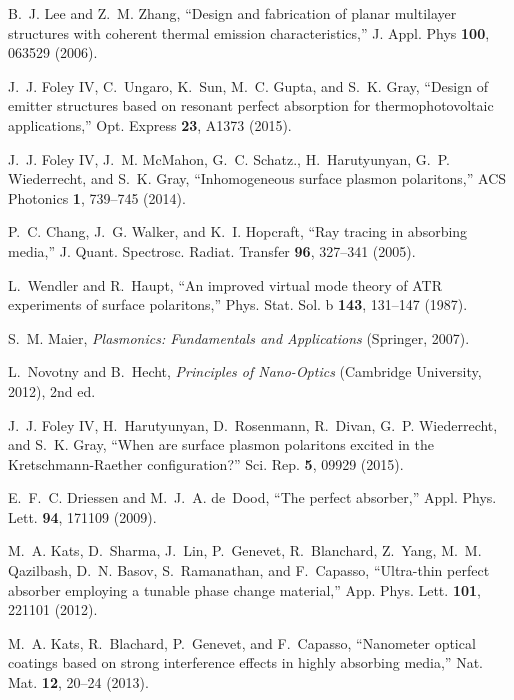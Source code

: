 \documentclass[10pt,letterpaper]{article}
\begin{document}
\begin{thebibliography}{100}
B.~J. Lee and Z.~M. Zhang, \enquote{Design and fabrication of planar multilayer
  structures with coherent thermal emission characteristics,} J. Appl. Phys
  \textbf{100}, 063529 (2006).

J.~J. {Foley IV}, C.~Ungaro, K.~Sun, M.~C. Gupta, and S.~K. Gray,
  \enquote{Design of emitter structures based on resonant perfect absorption
  for thermophotovoltaic applications,} Opt. Express \textbf{23}, A1373 (2015).

J.~J. {Foley IV}, J.~M. McMahon, G.~C. Schatz., H.~Harutyunyan, G.~P.
  Wiederrecht, and S.~K. Gray, \enquote{Inhomogeneous surface plasmon
  polaritons,} ACS Photonics \textbf{1}, 739--745 (2014).

P.~C. Chang, J.~G. Walker, and K.~I. Hopcraft, \enquote{Ray tracing in
  absorbing media,} J. Quant. Spectrosc. Radiat. Transfer \textbf{96}, 327--341
  (2005).

L.~Wendler and R.~Haupt, \enquote{An improved virtual mode theory of {ATR}
  experiments of surface polaritons,} Phys. Stat. Sol. b \textbf{143}, 131--147
  (1987).

S.~M. Maier, \emph{Plasmonics: Fundamentals and Applications} (Springer, 2007).

L.~Novotny and B.~Hecht, \emph{Principles of Nano-Optics} (Cambridge
  University, 2012), 2nd ed.

J.~J. {Foley IV}, H.~Harutyunyan, D.~Rosenmann, R.~Divan, G.~P. Wiederrecht,
  and S.~K. Gray, \enquote{When are surface plasmon polaritons excited in the
  {K}retschmann-{R}aether configuration?} Sci. Rep. \textbf{5}, 09929 (2015).

E.~F.~C. Driessen and M.~J.~A. de~Dood, \enquote{The perfect absorber,} Appl.
  Phys. Lett. \textbf{94}, 171109 (2009).

M.~A. Kats, D.~Sharma, J.~Lin, P.~Genevet, R.~Blanchard, Z.~Yang, M.~M.
  Qazilbash, D.~N. Basov, S.~Ramanathan, and F.~Capasso, \enquote{Ultra-thin
  perfect absorber employing a tunable phase change material,} App. Phys. Lett.
  \textbf{101}, 221101 (2012).

M.~A. Kats, R.~Blachard, P.~Genevet, and F.~Capasso, \enquote{Nanometer optical
  coatings based on strong interference effects in highly absorbing media,}
  Nat. Mat. \textbf{12}, 20--24 (2013).


\end{thebibliography}
\end{document}

